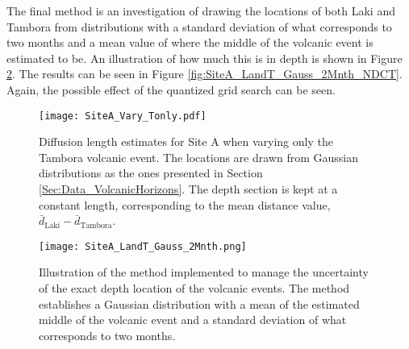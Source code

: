 \documentclass[../../CompleteThesis2/Complete_2ndDraft]{subfiles}
\begin{document}
The final method is an investigation of drawing the locations of both Laki and Tambora from distributions with a standard deviation of what corresponds to two months and a mean value of where the middle of the volcanic event is estimated to be. An illustration of how much this is in depth is shown in Figure \ref{fig:SiteA_LandT_Gauss_2Mnth}. The results can be seen in Figure \ref{fig:SiteA_LandT_Gauss_2Mnth_NDCT}. Again, the possible effect of the quantized grid search can be seen.


\begin{figure}[!h]
	\centering
	\texttt{[image: SiteA\_Vary\_Tonly.pdf]}
	\caption[Diffusion Length Variations, Varying only Tambora]{\small Diffusion length estimates for Site A when varying only the Tambora volcanic event. The locations are drawn from Gaussian distributions as the ones presented in Section \ref{Sec:Data_VolcanicHorizons}. The depth section is kept at a constant length, corresponding to the mean distance value, $\bar{d}_{\text{Laki}}-\bar{d}_{\text{Tambora}}$.}
	\label{fig:SiteA_Vary_Lonly}
\end{figure}




\begin{figure}[!h]
	\centering
	\texttt{[image: SiteA\_LandT\_Gauss\_2Mnth.png]}
	\caption[Illustration of 2 Month Standard Deviation Variation of Volcanic Events Locations]{\small Illustration of the method implemented to manage the uncertainty of the exact depth location of the volcanic events. The method establishes a Gaussian distribution with a mean of the estimated middle of the volcanic event and a standard deviation of what corresponds to two months.}
	\label{fig:SiteA_LandT_Gauss_2Mnth}
\end{figure}

\end{document}
